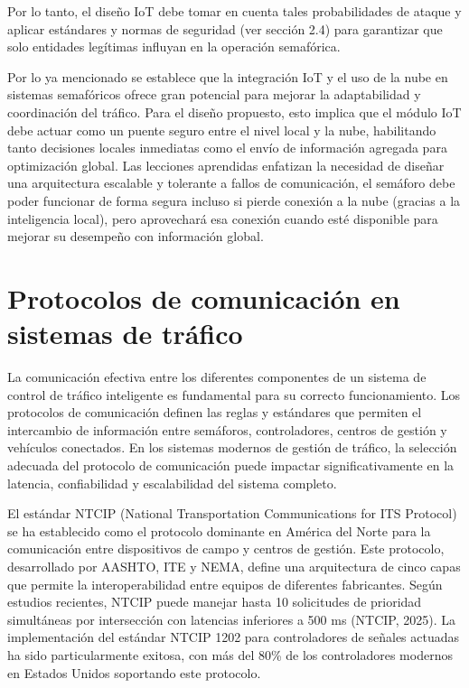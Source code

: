 \documentclass[12pt,a4paper,oneside]{report}
\begin{document}
Por lo tanto, el diseño IoT debe tomar en cuenta tales probabilidades de ataque y aplicar estándares y normas de seguridad (ver sección 2.4) para garantizar que solo entidades legítimas influyan en la operación semafórica.

Por lo ya mencionado se establece que la integración IoT y el uso de la nube en sistemas semafóricos ofrece gran potencial para mejorar la adaptabilidad y coordinación del tráfico. Para el diseño propuesto, esto implica que el módulo IoT debe actuar como un puente seguro entre el nivel local y la nube, habilitando tanto decisiones locales inmediatas como el envío de información agregada para optimización global. Las lecciones aprendidas enfatizan la necesidad de diseñar una arquitectura escalable y tolerante a fallos de comunicación, el semáforo debe poder funcionar de forma segura incluso si pierde conexión a la nube (gracias a la inteligencia local), pero aprovechará esa conexión cuando esté disponible para mejorar su desempeño con información global.

\section{Protocolos de comunicación en sistemas de tráfico}\label{protocolos-de-comunicaciuxf3n-en-sistemas-de-truxe1fico}

La comunicación efectiva entre los diferentes componentes de un sistema de control de tráfico inteligente es fundamental para su correcto funcionamiento. Los protocolos de comunicación definen las reglas y estándares que permiten el intercambio de información entre semáforos, controladores, centros de gestión y vehículos conectados. En los sistemas modernos de gestión de tráfico, la selección adecuada del protocolo de comunicación puede impactar significativamente en la latencia, confiabilidad y escalabilidad del sistema completo.

El estándar NTCIP (National Transportation Communications for ITS Protocol) se ha establecido como el protocolo dominante en América del Norte para la comunicación entre dispositivos de campo y centros de gestión. Este protocolo, desarrollado por AASHTO, ITE y NEMA, define una arquitectura de cinco capas que permite la interoperabilidad entre equipos de diferentes fabricantes. Según estudios recientes, NTCIP puede manejar hasta 10 solicitudes de prioridad simultáneas por intersección con latencias inferiores a 500 ms (NTCIP, 2025). La implementación del estándar NTCIP 1202 para controladores de señales actuadas ha sido particularmente exitosa, con más del 80\% de los controladores modernos en Estados Unidos soportando este protocolo.
\end{document}
